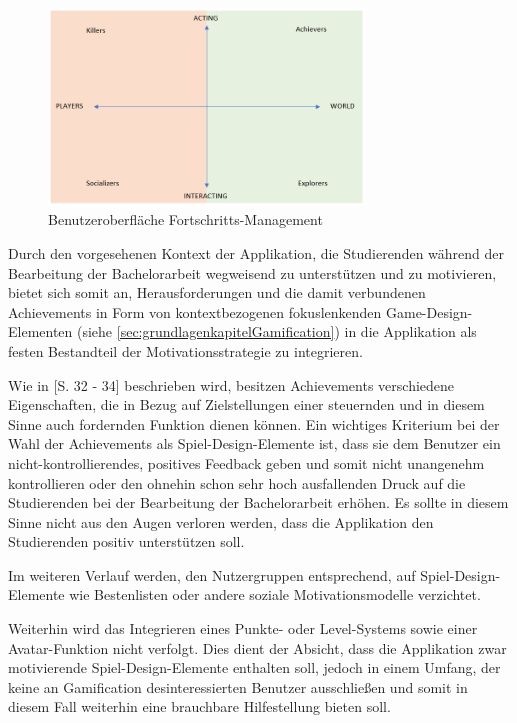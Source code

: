 \documentclass[bibliography=totoc,listof=totoc,BCOR=5mm,DIV=12,oneside]{scrbook}
\begin{document}
\begin{figure}[H]
	\centering
	\includegraphics[width=0.75\textwidth, keepaspectratio]{Bilder/Diagramme/InterestGraphBartleAchieversExplorers.png}
	\caption{Benutzeroberfläche Fortschritts-Management}
	\label{img:interestGraphBartleAchiversExplorers}
\end{figure}

\par Durch den vorgesehenen Kontext der Applikation, die Studierenden während der Bearbeitung der Bachelorarbeit wegweisend zu unterstützen und zu motivieren, bietet sich somit an, Herausforderungen und die damit verbundenen Achievements in Form von kontextbezogenen fokuslenkenden Game-Design-Elementen (siehe \ref{sec:grundlagenkapitelGamification}) in die Applikation als festen Bestandteil der Motivationsstrategie zu integrieren.

\par\medskip Wie in \citep{Sailer2016}[S. 32 - 34] beschrieben wird, besitzen Achievements verschiedene Eigenschaften, die in Bezug auf Zielstellungen einer steuernden und in diesem Sinne auch fordernden Funktion dienen können. Ein wichtiges Kriterium bei der Wahl der Achievements als Spiel-Design-Elemente ist, dass sie dem Benutzer ein nicht-kontrollierendes, positives Feedback geben und somit nicht unangenehm kontrollieren oder den ohnehin schon sehr hoch ausfallenden Druck auf die Studierenden bei der Bearbeitung der Bachelorarbeit erhöhen. Es sollte in diesem Sinne nicht aus den Augen verloren werden, dass die Applikation den Studierenden positiv unterstützen soll.

\par\medskip Im weiteren Verlauf werden, den Nutzergruppen entsprechend, auf Spiel-Design-Elemente wie Bestenlisten oder andere soziale Motivationsmodelle verzichtet.

\par Weiterhin wird das Integrieren eines Punkte- oder Level-Systems sowie einer Avatar-Funktion nicht verfolgt. Dies dient der Absicht, dass die Applikation zwar motivierende Spiel-Design-Elemente enthalten soll, jedoch in einem Umfang, der keine an Gamification desinteressierten Benutzer ausschließen und somit in diesem Fall weiterhin eine brauchbare Hilfestellung bieten soll.
\end{document}
